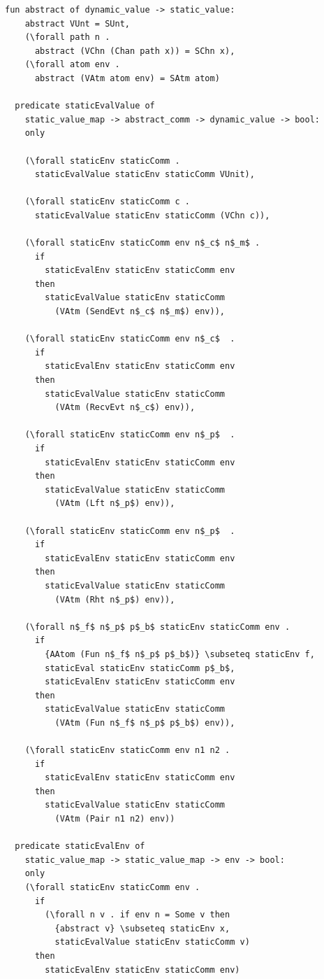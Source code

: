 \documentclass[10pt]{article}
\begin{document}
\begin{lstlisting}[language=logic, mathescape]
  fun abstract of dynamic_value -> static_value:
    abstract VUnt = SUnt, 
    (\forall path n . 
      abstract (VChn (Chan path x)) = SChn x),
    (\forall atom env .
      abstract (VAtm atom env) = SAtm atom)

  predicate staticEvalValue of
    static_value_map -> abstract_comm -> dynamic_value -> bool: 
    only

    (\forall staticEnv staticComm .
      staticEvalValue staticEnv staticComm VUnit),

    (\forall staticEnv staticComm c .
      staticEvalValue staticEnv staticComm (VChn c)),

    (\forall staticEnv staticComm env n$_c$ n$_m$ .
      if
        staticEvalEnv staticEnv staticComm env
      then
        staticEvalValue staticEnv staticComm
          (VAtm (SendEvt n$_c$ n$_m$) env)),

    (\forall staticEnv staticComm env n$_c$  .
      if
        staticEvalEnv staticEnv staticComm env
      then
        staticEvalValue staticEnv staticComm
          (VAtm (RecvEvt n$_c$) env)),

    (\forall staticEnv staticComm env n$_p$  .
      if
        staticEvalEnv staticEnv staticComm env
      then
        staticEvalValue staticEnv staticComm
          (VAtm (Lft n$_p$) env)),
        
    (\forall staticEnv staticComm env n$_p$  .
      if
        staticEvalEnv staticEnv staticComm env
      then
        staticEvalValue staticEnv staticComm
          (VAtm (Rht n$_p$) env)),

    (\forall n$_f$ n$_p$ p$_b$ staticEnv staticComm env .
      if
        {AAtom (Fun n$_f$ n$_p$ p$_b$)} \subseteq staticEnv f, 
        staticEval staticEnv staticComm p$_b$, 
        staticEvalEnv staticEnv staticComm env
      then
        staticEvalValue staticEnv staticComm
          (VAtm (Fun n$_f$ n$_p$ p$_b$) env)),

    (\forall staticEnv staticComm env n1 n2 .
      if
        staticEvalEnv staticEnv staticComm env
      then
        staticEvalValue staticEnv staticComm
          (VAtm (Pair n1 n2) env))

  predicate staticEvalEnv of
    static_value_map -> static_value_map -> env -> bool:
    only 
    (\forall staticEnv staticComm env .
      if
        (\forall n v . if env n = Some v then
          {abstract v} \subseteq staticEnv x,
          staticEvalValue staticEnv staticComm v)
      then 
        staticEvalEnv staticEnv staticComm env)


\end{lstlisting}
\end{document}
